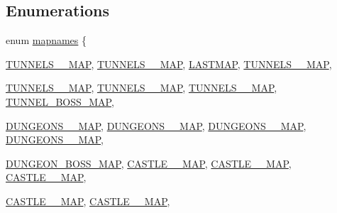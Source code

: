 \subsection*{Enumerations}
\begin{DoxyCompactItemize}
\item 
enum \hyperlink{MAPSWL6_8H_a1949852ef0462081a2b248dd4918bb86}{mapnames} \{ \par
\hyperlink{MAPSSDM_8H_a1949852ef0462081a2b248dd4918bb86acbdf704da923641aa047528fadd773fa}{TUNNELS\_\_\-MAP}, 
\hyperlink{MAPSSDM_8H_a1949852ef0462081a2b248dd4918bb86a0714d98acd387ceab72b37c2ce15337b}{TUNNELS\_\_\-MAP}, 
\hyperlink{MAPSSDM_8H_a1949852ef0462081a2b248dd4918bb86ad3af5aeeef56724be68af11d0a6680b3}{LASTMAP}, 
\hyperlink{MAPSSOD_8H_a1949852ef0462081a2b248dd4918bb86acbdf704da923641aa047528fadd773fa}{TUNNELS\_\_\-MAP}, 
\par
\hyperlink{MAPSSOD_8H_a1949852ef0462081a2b248dd4918bb86a0714d98acd387ceab72b37c2ce15337b}{TUNNELS\_\_\-MAP}, 
\hyperlink{MAPSSOD_8H_a1949852ef0462081a2b248dd4918bb86a0d874dc7ecc82a838419319fdf1e8981}{TUNNELS\_\_\-MAP}, 
\hyperlink{MAPSSOD_8H_a1949852ef0462081a2b248dd4918bb86acaaf614245869150fddf14e70c58e814}{TUNNELS\_\_\-MAP}, 
\hyperlink{MAPSSOD_8H_a1949852ef0462081a2b248dd4918bb86a00ffe67ecf2d79d6e249734e3c10f835}{TUNNEL\_\-BOSS\_\-MAP}, 
\par
\hyperlink{MAPSSOD_8H_a1949852ef0462081a2b248dd4918bb86a2a41440fb231f456ba48a61b3750a433}{DUNGEONS\_\_\-MAP}, 
\hyperlink{MAPSSOD_8H_a1949852ef0462081a2b248dd4918bb86a71604e9c0be7e84b7a077e1014d16551}{DUNGEONS\_\_\-MAP}, 
\hyperlink{MAPSSOD_8H_a1949852ef0462081a2b248dd4918bb86ac36508495618f8433a43efca3cb5db5d}{DUNGEONS\_\_\-MAP}, 
\hyperlink{MAPSSOD_8H_a1949852ef0462081a2b248dd4918bb86a708337f0295e8e4da5d955451956a603}{DUNGEONS\_\_\-MAP}, 
\par
\hyperlink{MAPSSOD_8H_a1949852ef0462081a2b248dd4918bb86a1b3c9e6cc77c7f84b6ae038051781e3d}{DUNGEON\_\-BOSS\_\-MAP}, 
\hyperlink{MAPSSOD_8H_a1949852ef0462081a2b248dd4918bb86a4c9c00b088ae5f84423f30ea9fa44f33}{CASTLE\_\_\-MAP}, 
\hyperlink{MAPSSOD_8H_a1949852ef0462081a2b248dd4918bb86acb20a9eff2b66ec774cd4516ad2c6d13}{CASTLE\_\_\-MAP}, 
\hyperlink{MAPSSOD_8H_a1949852ef0462081a2b248dd4918bb86a06b22b4044c73d114ec301f7e57fb22c}{CASTLE\_\_\-MAP}, 
\par
\hyperlink{MAPSSOD_8H_a1949852ef0462081a2b248dd4918bb86a28ed3377e1f3f1b3e58971f3ad0c309b}{CASTLE\_\_\-MAP}, 
\hyperlink{MAPSSOD_8H_a1949852ef0462081a2b248dd4918bb86a58f71fa3fe4e1ad30c5a546fb2578cca}{CASTLE\_\_\-MAP}, 

\end{DoxyCompactItemize}
